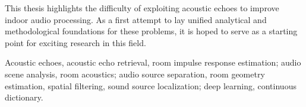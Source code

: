 {    \mynewline
    This thesis highlights the difficulty of exploiting acoustic echoes to improve indoor audio processing.
    As a first attempt to lay unified analytical and methodological foundations for these problems, it is hoped to serve as a starting point for exciting research in this field.

    Acoustic echoes, acoustic echo retrieval, room impulse response estimation;
    audio scene analysis, room acoustics;
    audio source separation, room geometry estimation, spatial filtering, sound source localization;
    deep learning, continuous dictionary.
}